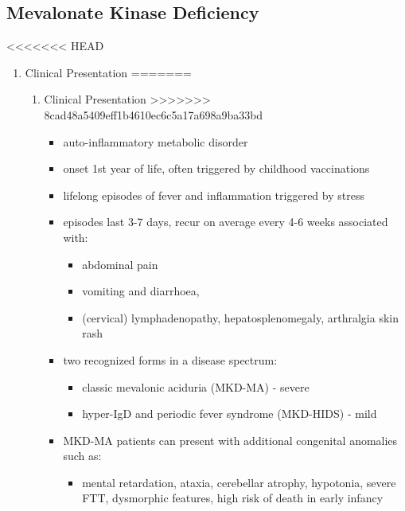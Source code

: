 \documentclass{scrartcl}
\begin{document}
\begin{itemize}
\subsection{Mevalonate Kinase Deficiency}
<<<<<<< HEAD
\label{sec:orgb71d798}
\begin{enumerate}
\item Clinical Presentation
\label{sec:org356cd6a}
=======
\label{sec:org2807d45}
\begin{enumerate}
\item Clinical Presentation
\label{sec:org56e330b}
>>>>>>> 8cad48a5409eff1b4610ec6c5a17a698a9ba33bd
\begin{itemize}
\item auto-inflammatory metabolic disorder
\item onset 1st year of life, often triggered by childhood vaccinations
\item lifelong episodes of fever and inflammation triggered by stress
\item episodes last 3-7 days, recur on average every 4-6 weeks associated with:
\begin{itemize}
\item abdominal pain
\item vomiting and diarrhoea,
\item (cervical) lymphadenopathy, hepatosplenomegaly, arthralgia skin rash
\end{itemize}
\item two recognized forms in a disease spectrum:
\begin{itemize}
\item classic mevalonic aciduria (MKD-MA) - severe
\item hyper-IgD and periodic fever syndrome (MKD-HIDS) - mild
\end{itemize}

\item MKD-MA patients can present with additional congenital anomalies
such as:
\begin{itemize}
\item mental retardation, ataxia, cerebellar atrophy, hypotonia, severe
FTT, dysmorphic features, high risk of death in early infancy
\end{itemize}
\end{itemize}


\end{enumerate}
\end{enumerate}
\end{itemize}
\end{document}
